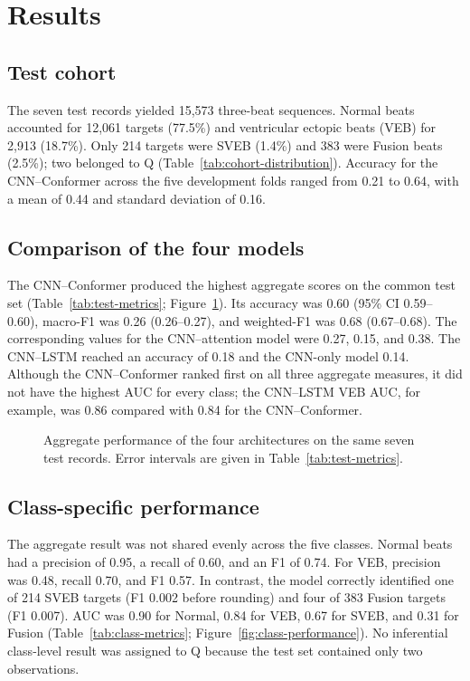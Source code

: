 \section{Results}

\subsection{Test cohort}
The seven test records yielded 15{,}573 three-beat sequences. Normal beats accounted for 12{,}061 targets (77.5\%) and ventricular ectopic beats (VEB) for 2{,}913 (18.7\%). Only 214 targets were SVEB (1.4\%) and 383 were Fusion beats (2.5\%); two belonged to Q (Table~\ref{tab:cohort-distribution}). Accuracy for the CNN--Conformer across the five development folds ranged from 0.21 to 0.64, with a mean of 0.44 and standard deviation of 0.16.



\subsection{Comparison of the four models}
The CNN--Conformer produced the highest aggregate scores on the common test set (Table~\ref{tab:test-metrics}; Figure~\ref{fig:model-comparison}). Its accuracy was 0.60 (95\% CI 0.59--0.60), macro-F1 was 0.26 (0.26--0.27), and weighted-F1 was 0.68 (0.67--0.68). The corresponding values for the CNN--attention model were 0.27, 0.15, and 0.38. The CNN--LSTM reached an accuracy of 0.18 and the CNN-only model 0.14. Although the CNN--Conformer ranked first on all three aggregate measures, it did not have the highest AUC for every class; the CNN--LSTM VEB AUC, for example, was 0.86 compared with 0.84 for the CNN--Conformer.



\begin{figure}[t]
  \centering
  \resizebox{0.94\textwidth}{!}{}
  \caption{Aggregate performance of the four architectures on the same seven test records. Error intervals are given in Table~\ref{tab:test-metrics}.}
  \label{fig:model-comparison}
\end{figure}

\subsection{Class-specific performance}
The aggregate result was not shared evenly across the five classes. Normal beats had a precision of 0.95, a recall of 0.60, and an F1 of 0.74. For VEB, precision was 0.48, recall 0.70, and F1 0.57. In contrast, the model correctly identified one of 214 SVEB targets (F1 0.002 before rounding) and four of 383 Fusion targets (F1 0.007). AUC was 0.90 for Normal, 0.84 for VEB, 0.67 for SVEB, and 0.31 for Fusion (Table~\ref{tab:class-metrics}; Figure~\ref{fig:class-performance}). No inferential class-level result was assigned to Q because the test set contained only two observations.

